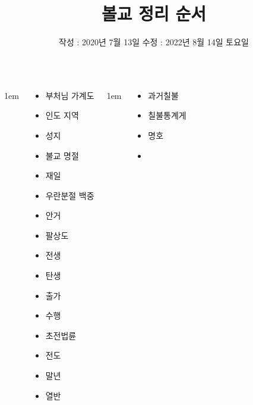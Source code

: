 \documentclass[20pt, a0paper, landscape]{tikzposter}
\title{ 볼교 정리 순서 }
\author{ 	작성 : 2020년 7월 13일  
			수정 : 2022년 8월 14일 토요일 }
\begin{document}
	\maketitle

	\begin{columns}


			{
					\setlength{\leftmargini}{4em}
					\setlength{\labelsep} {1em}
				\begin{LARGE}
					\begin{itemize}
					\item 부처님 가계도
					\item 인도 지역
					\item 성지
					\item 불교 명절
					\item 재일 
					\item 우란분절 백중
					\item 안거 

					\item 팔상도
					\item 전생
					\item 탄생
					\item 출가
					\item 수행
					\item 초전법륜
					\item 전도
					\item 말년
					\item 열반
					\end{itemize}
				\end{LARGE}
			} %


			{
					\setlength{\leftmargini}{4em}
					\setlength{\labelsep} {1em}
				\begin{LARGE}
					\begin{itemize}
					\item 과거칠불
					\item 칠불통계게
					\item 명호
					\item 
					\end{itemize}
				\end{LARGE}
			} %



\end{columns}
\end{document}
